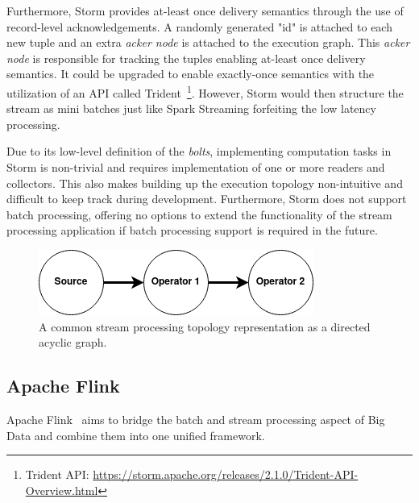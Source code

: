 Furthermore, Storm provides at-least once 
delivery semantics through the use of record-level acknowledgements. A randomly 
generated "id" is attached to each new tuple and an extra \emph{acker node} is attached 
to the execution graph. This \emph{acker node} is responsible for tracking the tuples 
enabling at-least once delivery semantics. It could be upgraded to enable 
exactly-once semantics with the utilization of an API called
Trident~\footnote{Trident API: \url{https://storm.apache.org/releases/2.1.0/Trident-API-Overview.html}}. However, Storm would then structure the stream as mini batches just like 
Spark Streaming forfeiting the low latency processing. 

Due to its low-level definition of the \emph{bolts}, implementing computation tasks 
in Storm is non-trivial and requires implementation of one or more readers and 
collectors. This also makes building up the execution topology non-intuitive 
and difficult to keep track during development. Furthermore, Storm does not support 
batch processing, offering no options to extend the functionality of the stream 
processing application if batch processing support is required in the future. 
\newpage
\begin{figure}[!htpb]
    \centering
    \includegraphics[width=0.5\linewidth]{fig/dag.png}
    \caption{A common stream processing topology representation as a directed acyclic graph.} 
    \label{fig:dag_topology}
\end{figure}

\subsection{Apache Flink}%
\label{sub:Apache Flink}

Apache Flink~\cite{flink} aims to bridge the batch and stream processing aspect of 
Big Data and combine them into one unified framework.   

